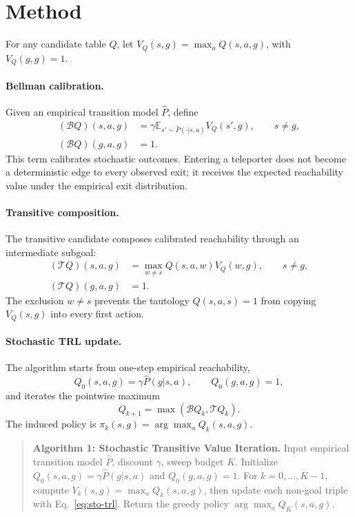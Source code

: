 \documentclass[10pt]{article}
\newcommand{\E}{\mathbb{E}}
\newcommand{\Phat}{\widehat{P}}
\begin{document}
\section{Method}

For any candidate table $Q$, let $V_Q(s,g)=\max_a Q(s,a,g)$, with
$V_Q(g,g)=1$.

\paragraph{Bellman calibration.}
Given an empirical transition model $\Phat$, define
\begin{align}
(\mathcal{B}Q)(s,a,g)
&= \gamma \E_{s'\sim \Phat(\cdot|s,a)} V_Q(s',g),
    \qquad s\neq g,\\
(\mathcal{B}Q)(g,a,g) &= 1.
\end{align}
This term calibrates stochastic outcomes. Entering a teleporter does not become
a deterministic edge to every observed exit; it receives the expected
reachability value under the empirical exit distribution.

\paragraph{Transitive composition.}
The transitive candidate composes calibrated reachability through an
intermediate subgoal:
\begin{align}
(\mathcal{T}Q)(s,a,g)
&= \max_{w\neq s} Q(s,a,w)V_Q(w,g),
    \qquad s\neq g,\\
(\mathcal{T}Q)(g,a,g) &= 1.
\end{align}
The exclusion $w\neq s$ prevents the tautology $Q(s,a,s)=1$ from copying
$V_Q(s,g)$ into every first action.

\paragraph{Stochastic TRL update.}
The algorithm starts from one-step empirical reachability,
\begin{equation}
Q_0(s,a,g)=\gamma \Phat(g|s,a),\qquad Q_0(g,a,g)=1,
\end{equation}
and iterates the pointwise maximum
\begin{equation}
Q_{k+1}=\max(\mathcal{B}Q_k,\mathcal{T}Q_k).
\label{eq:sto-trl}
\end{equation}
The induced policy is $\pi_k(s,g)=\arg\max_a Q_k(s,a,g)$.

\begin{quote}
\small
\textbf{Algorithm 1: Stochastic Transitive Value Iteration.}
Input empirical transition model $\Phat$, discount $\gamma$, sweep budget $K$.
Initialize $Q_0(s,a,g)=\gamma \Phat(g|s,a)$ and $Q_0(g,a,g)=1$.
For $k=0,\ldots,K-1$, compute $V_k(s,g)=\max_a Q_k(s,a,g)$, then update each
non-goal triple with Eq.~\eqref{eq:sto-trl}. Return the greedy policy
$\arg\max_a Q_K(s,a,g)$.
\end{quote}
\end{document}
